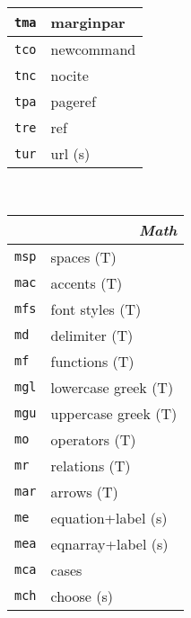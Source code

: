 \documentclass[oneside,10pt,landscape,DIV16]{scrartcl}
\newcommand{\Map}[1] {\textbf{\textasciiacute}\texttt{#1}}
\begin{document}
\begin{multicols}{3}
\begin{center}
\begin{tabular}[]{|p{11mm}|p{60mm}|}
\hline \Map{tma}  & marginpar                      \\
\hline \Map{tco}  & newcommand                     \\
\hline \Map{tnc}  & nocite                         \\
\hline \Map{tpa}  & pageref                        \\
\hline \Map{tre}  & ref                            \\
\hline \Map{tur}  & url                            \hfill (s)\\
\hline
%
\end{tabular}\\
%
\begin{tabular}[]{|p{11mm}|p{62mm}|}
\hline
\multicolumn{2}{|r|}{\textsl{\textbf{M}ath}}  \\[1.0ex]
\hline  \Map{msp} & spaces                    \hfill (T)\\
\hline  \Map{mac} & accents                   \hfill (T)\\
\hline  \Map{mfs} & font styles               \hfill (T)\\
\hline  \Map{md}  & delimiter                 \hfill (T)\\
\hline  \Map{mf}  & functions                 \hfill (T)\\
\hline  \Map{mgl} & lowercase  greek          \hfill (T)\\
\hline  \Map{mgu} & uppercase greek           \hfill (T)\\
\hline  \Map{mo}  & operators                 \hfill (T)\\
\hline  \Map{mr}  & relations                 \hfill (T)\\
\hline  \Map{mar} & arrows                    \hfill (T)\\
\hline
\hline  \Map{me}  & equation+label            \hfill (s)\\
\hline  \Map{mea} & eqnarray+label            \hfill (s)\\
\hline
\hline  \Map{mca} & cases                     \\
\hline  \Map{mch} & choose                    \hfill (s)\\

\end{tabular}
\end{center}
\end{multicols}
\end{document}
